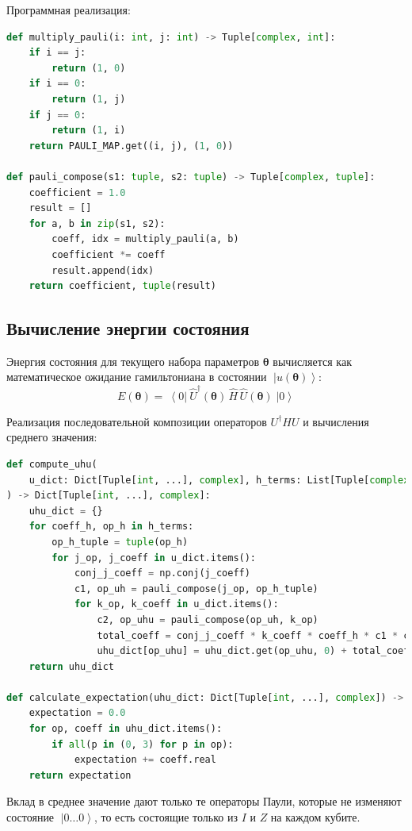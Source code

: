 \documentclass[a4paper]{report}
\newcommand{\ket}[1] {\!\!\;\ensuremath{\left|#1\right\rangle}}
\newcommand{\bra}[1] {\!\!\:\ensuremath{\left\langle#1\right|\!\!\:}}
\begin{document}
Программная реализация:

\begin{lstlisting}[language=Python]
def multiply_pauli(i: int, j: int) -> Tuple[complex, int]:
    if i == j:
        return (1, 0)
    if i == 0:
        return (1, j)
    if j == 0:
        return (1, i)
    return PAULI_MAP.get((i, j), (1, 0))

def pauli_compose(s1: tuple, s2: tuple) -> Tuple[complex, tuple]:
    coefficient = 1.0
    result = []
    for a, b in zip(s1, s2):
        coeff, idx = multiply_pauli(a, b)
        coefficient *= coeff
        result.append(idx)
    return coefficient, tuple(result)
\end{lstlisting}

\subsection{Вычисление энергии состояния}

Энергия состояния для текущего набора параметров $\bm\theta$ вычисляется как математическое ожидание гамильтониана в состоянии $\ket{u(\bm\theta)}$:
\begin{equation}
    E(\bm\theta) = \bra{0} \hat{U}^\dagger(\bm\theta)\, \hat{H} \, \hat{U}(\bm\theta) \ket{0}
\end{equation}

Реализация последовательной композиции операторов $U^\dagger H U$ и вычисления среднего значения:
\begin{lstlisting}[language=Python]
def compute_uhu(
    u_dict: Dict[Tuple[int, ...], complex], h_terms: List[Tuple[complex, List[int]]]
) -> Dict[Tuple[int, ...], complex]:
    uhu_dict = {}
    for coeff_h, op_h in h_terms:
        op_h_tuple = tuple(op_h)
        for j_op, j_coeff in u_dict.items():
            conj_j_coeff = np.conj(j_coeff)
            c1, op_uh = pauli_compose(j_op, op_h_tuple)
            for k_op, k_coeff in u_dict.items():
                c2, op_uhu = pauli_compose(op_uh, k_op)
                total_coeff = conj_j_coeff * k_coeff * coeff_h * c1 * c2
                uhu_dict[op_uhu] = uhu_dict.get(op_uhu, 0) + total_coeff
    return uhu_dict

def calculate_expectation(uhu_dict: Dict[Tuple[int, ...], complex]) -> float:
    expectation = 0.0
    for op, coeff in uhu_dict.items():
        if all(p in (0, 3) for p in op):
            expectation += coeff.real
    return expectation
\end{lstlisting}

Вклад в среднее значение дают только те операторы Паули, которые не изменяют состояние $\ket{0\ldots0}$, то есть состоящие только из $I$ и $Z$ на каждом кубите.
\end{document}
